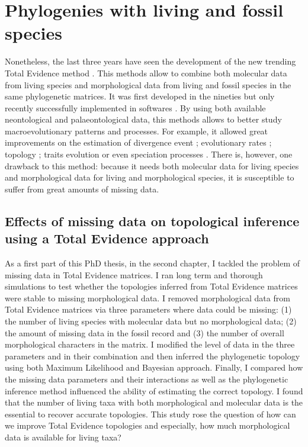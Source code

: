 \section{Phylogenies with living and fossil species}
Nonetheless, the last three years have seen the development of the new trending Total Evidence method \citep{ronquista2012,slaterphylogenetic2013,Wood01032013,schragocombining2013,beckancient2014,Arcila2015131,Dembo2015}.
This methods allow to combine both molecular data from living species and morphological data from living and fossil species in the same phylogenetic matrices.
It was first developed in the nineties \citep{eernissetaxonomic1993} but only recently successfully implemented in softwares \citep{Ronquist2012mrbayes,BEAST2}.
By using both available neontological and palaeontological data, this methods allows to better study macroevolutionary patterns and processes.
For example, it allowed great improvements on the estimation of divergence event \citep[e.g.][]{ronquista2012}; evolutionary rates \citep[e.g.][]{beckancient2014}; topology \citep[e.g.][]{Dembo2015}; traits evolution \citep[e.g.][]{slaterphylogenetic2013} or even speciation processes \citep[e.g.][]{Wood01032013}.
There is, however, one drawback to this method: because it needs both molecular data for living species and morphological data for living and morphological species, it is susceptible to suffer from great amounts of missing data.

\subsection{Effects of missing data on topological inference using a Total Evidence approach}
As a first part of this PhD thesis, in the second chapter, I tackled the problem of missing data in Total Evidence matrices.
I ran long term and thorough simulations to test whether the topologies inferred from Total Evidence matrices were stable to missing morphological data.
I removed morphological data from Total Evidence matrices via three parameters where data could be missing: (1) the number of living species with molecular data but no morphological data; (2) the amount of missing data in the fossil record and (3) the number of overall morphological characters in the matrix.
I modified the level of data in the three parameters and in their combination and then inferred the phylogenetic topology using both Maximum Likelihood and Bayesian approach.
Finally, I compared how the missing data parameters and their interactions as well as the phylogenetic inference method influenced the ability of estimating the correct topology.
I found that the number of living taxa with both morphological and molecular data is the essential to recover accurate topologies.
This study rose the question of how can we improve Total Evidence topologies and especially, how much morphological data is available for living taxa?

